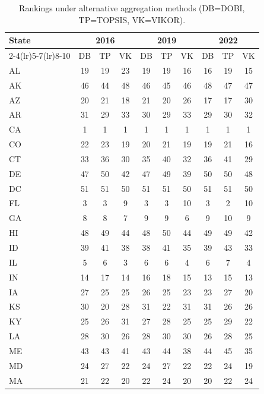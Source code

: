 \documentclass{article}
\newcounter{subsubsubsection}[subsubsection]
\begin{document}
\begin{table}[H]
\centering
\caption{Rankings under alternative aggregation methods (DB=DOBI, TP=TOPSIS, VK=VIKOR).\label{tab:trans-stab}}
\scriptsize
\setlength{\tabcolsep}{2.5pt}
\begin{tabular}{l*{9}{c}}
\toprule
\multirow{2}{*}{State} & \multicolumn{3}{c}{2016} & \multicolumn{3}{c}{2019} & \multicolumn{3}{c}{2022} \\
\cmidrule(lr){2-4}\cmidrule(lr){5-7}\cmidrule(lr){8-10}
 & DB & TP & VK & DB & TP & VK & DB & TP & VK \\
\midrule
AL & 19 & 19 & 23 & 19 & 19 & 16 & 16 & 19 & 15 \\
AK & 46 & 44 & 48 & 46 & 45 & 46 & 48 & 47 & 47 \\
AZ & 20 & 21 & 18 & 21 & 20 & 26 & 17 & 17 & 30 \\
AR & 31 & 29 & 33 & 30 & 29 & 33 & 29 & 30 & 32 \\
CA & 1 & 1 & 1 & 1 & 1 & 1 & 1 & 1 & 1 \\
CO & 22 & 23 & 19 & 20 & 21 & 19 & 19 & 21 & 16 \\
CT & 33 & 36 & 30 & 35 & 40 & 32 & 36 & 41 & 29 \\
DE & 47 & 50 & 42 & 47 & 49 & 39 & 50 & 50 & 48 \\
DC & 51 & 51 & 50 & 51 & 51 & 50 & 51 & 51 & 50 \\
FL & 3 & 3 & 9 & 3 & 3 & 10 & 3 & 2 & 10 \\
GA & 8 & 8 & 7 & 9 & 9 & 6 & 9 & 10 & 9 \\
HI & 48 & 49 & 44 & 48 & 50 & 44 & 49 & 49 & 42 \\
ID & 39 & 41 & 38 & 38 & 41 & 35 & 39 & 43 & 33 \\
IL & 5 & 6 & 3 & 6 & 6 & 4 & 6 & 7 & 4 \\
IN & 14 & 17 & 14 & 16 & 18 & 15 & 13 & 15 & 13 \\
IA & 27 & 25 & 25 & 26 & 25 & 23 & 23 & 27 & 20 \\
KS & 30 & 20 & 28 & 31 & 22 & 31 & 31 & 26 & 26 \\
KY & 25 & 26 & 31 & 27 & 28 & 25 & 25 & 29 & 22 \\
LA & 28 & 30 & 26 & 28 & 30 & 30 & 26 & 28 & 25 \\
ME & 43 & 43 & 41 & 43 & 44 & 38 & 44 & 45 & 35 \\
MD & 24 & 27 & 22 & 24 & 27 & 22 & 22 & 24 & 19 \\
MA & 21 & 22 & 20 & 22 & 24 & 20 & 20 & 22 & 24 \\

\end{tabular}
\end{table}
\end{document}
